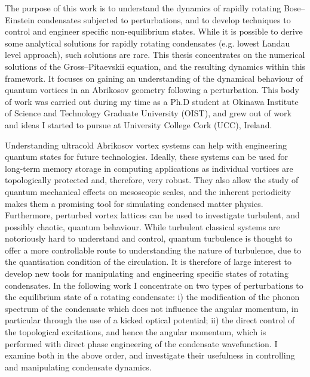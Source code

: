 
The purpose of this work is to understand the dynamics of rapidly rotating Bose--Einstein condensates subjected to perturbations, and to develop techniques to control and engineer specific non-equilibrium states. While it is possible to derive some analytical solutions for rapidly rotating condensates (e.g. lowest Landau level approach), such solutions are rare. This thesis concentrates on the numerical solutions of the Gross--Pitaevskii equation, and the resulting dynamics within this framework. It focuses on gaining an understanding of the dynamical behaviour of quantum vortices in an Abrikosov geometry following a perturbation. %
This body of work was carried out during my time as a Ph.D student at Okinawa Institute of Science and Technology Graduate University (OIST), and grew out of work and ideas I started to pursue at University College Cork (UCC), Ireland.

Understanding ultracold Abrikosov vortex systems can help with engineering quantum states for future technologies. Ideally, these systems can be used for long-term memory storage in computing applications as individual vortices are topologically protected and, therefore, very robust. They also allow the study of quantum mechanical effects on mesoscopic scales, and the inherent periodicity makes them a promising tool for simulating condensed matter physics. Furthermore, perturbed vortex lattices can be used to investigate turbulent, and possibly chaotic, quantum behaviour. While turbulent classical systems are notoriously hard to understand and control, quantum turbulence is thought to offer a more controllable route to understanding the nature of turbulence, due to the quantisation condition of the circulation. It is therefore of large interest to develop new tools for manipulating and engineering specific states of rotating condensates. In the following work I concentrate on two types of perturbations to the equilibrium state of a rotating condensate: i) the modification of the phonon spectrum of the condensate which does not influence the angular momentum, in particular through the use of a kicked optical potential; ii) the direct control of the topological excitations, and hence the angular momentum, which is performed with direct phase engineering of the condensate wavefunction. I examine both in the above order, and investigate their usefulness in controlling and manipulating condensate dynamics.

